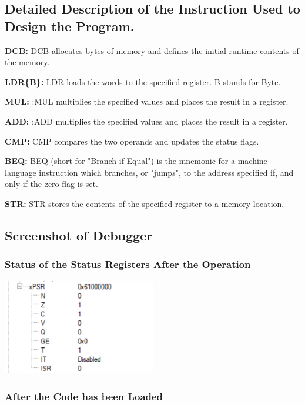 \documentclass{article}
\begin{document}
\subsection{Detailed Description of the Instruction Used to Design the Program.}

\item \textbf{DCB: }DCB allocates bytes of memory and defines the initial runtime contents of the memory.
\item \textbf{LDR\{B\}: }LDR loads the words to the specified register. B stands for Byte.
\item \textbf{MUL: }:MUL multiplies the specified values and places the result in a register.
\item \textbf{ADD: }:ADD multiplies the specified values and places the result in a register.
\item \textbf{CMP: }CMP compares the two operands and updates the status flags.
\item \textbf{BEQ: }BEQ (short for "Branch if Equal") is the mnemonic for a machine language instruction which branches, or "jumps", to the address specified if, and only if the zero flag is set.
\item \textbf{STR: }STR stores the contents of the specified register to a memory location.

\subsection{Screenshot of Debugger}

\subsubsection{Status of the Status Registers After the Operation}

\begin{center}
    \includegraphics[width=0.5\textwidth]{task_iii_B_PSR.png}
\end{center}

\subsubsection{After the Code has been Loaded}
\end{document}
